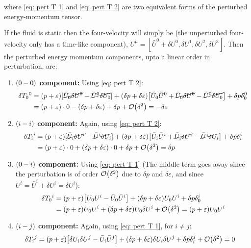 \documentclass[a4paper,12pt,onehalfspacing]{report}
\begin{document}
where \cref{eq: pert T 1} and \cref{eq: pert T 2} are two equivalent forms of the perturbed energy-momentum tensor. 

If the fluid is static then the four-velocity will simply be (the unperturbed four-velocity only has a time-like component), ${U}^\mu=[\bar{U}^0+\delta U^0, \delta U^1, \delta U^2, \delta U^3]$. Then the perturbed energy momentum components, upto a linear order in perturbation, are:

\begin{enumerate}
    \item \textbf{$\qty(0-0)$ component:} Using \cref{eq: pert T 2}:
    \begin{align*}
        \delta T_0{}^0&= \qty(p+\varepsilon)\qty[\cancel{\bar{U}_0 \delta U^0}-\cancel{\bar{U}^0 \delta U_0}]+\qty(\delta p+\delta\varepsilon)\qty[{\bar{U}_0 \bar{U}^0}+\cancel{\bar{U}_0 \delta U^0}-\cancel{\bar{U}^0 \delta U_0}] + \delta p\delta_0^0\\
        &= \qty(p+\varepsilon)\cdot 0-\qty(\delta p+\delta\varepsilon) + \delta p+ \mathcal{O}\qty(\delta^2)= -\delta \varepsilon
    \end{align*}
    \item \textbf{$\qty(i-i)$ component:} Again, using \cref{eq: pert T 2}:
    \begin{align*}
        \delta T_i{}^i&= \qty(p+\varepsilon)\qty[\cancel{\bar{U}_i \delta U^i}-\cancel{\bar{U}^i \delta U_i}]+\qty(\delta p+\delta\varepsilon)\qty[{\bar{U}_i \bar{U}^i}+\cancel{\bar{U}_i \delta U^i}-\cancel{\bar{U}^i \delta U_i}] + \delta p\delta_i^i\\
        &= \qty(p+\varepsilon)\cdot 0+\qty(\delta p+\delta\varepsilon)\cdot 0 + \delta p + \mathcal{O}\qty(\delta^2)= \delta p
    \end{align*}
    \item \textbf{$\qty(0-i)$ component:} Using \cref{eq: pert T 1} (The middle term goes away since the perturbation is of order $\mathcal{O}\qty(\delta^2)$ due to $\delta p$ and $\delta \varepsilon$, and since $U^i= \bar{U}^i+\delta U^i= \delta U^i$):
    \begin{align*}
        \delta T_0{}^i&= \qty(p+\varepsilon)\qty[U_0 U^i- \bar{U}_0 \bar{U}^i]+\qty(\delta p+\delta\varepsilon)U_0 U^i + \delta p\delta_0^i\\
        &= \qty(p+\varepsilon)U_0 U^i+\qty(\delta p+\delta\varepsilon)U_0 \delta U^i+ \mathcal{O}\qty(\delta^2)= \qty(p+\varepsilon)U_0 U^i
    \end{align*}
    \item \textbf{$\qty(i-j)$ component:} Again, using \cref{eq: pert T 1}, for $i\neq j$:
    \begin{align*}
        \delta T_i{}^j&= \qty(p+\varepsilon)\qty[\delta U_i \delta U^j- \bar{U}_i \bar{U}^j]+\qty(\delta p+\delta\varepsilon)\delta U_i \delta U^j + \delta p\delta_i^j+ \mathcal{O}\qty(\delta^2)= 0
    \end{align*}
\end{enumerate}
\end{document}
